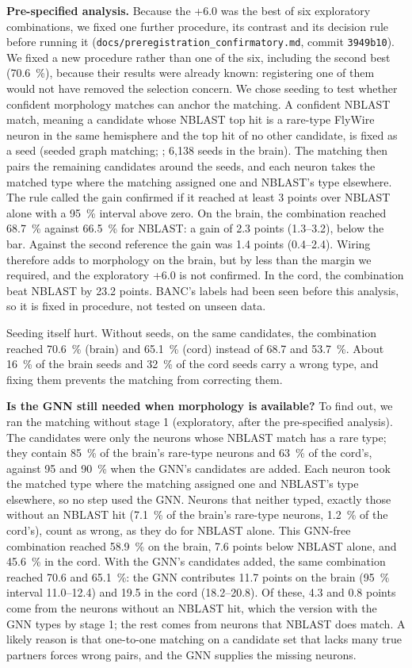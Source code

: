 \documentclass[11pt,a4paper]{article}
\begin{document}
\textbf{Pre-specified analysis.} Because the +6.0 was the best of six exploratory combinations, we fixed one further procedure, its contrast and its decision rule before running it (\texttt{docs/\allowbreak{}preregistration\_\allowbreak{}confirmatory.md}, commit \texttt{3949b10}). We fixed a new procedure rather than one of the six, including the second best (70.6~\%), because their results were already known: registering one of them would not have removed the selection concern. We chose seeding to test whether confident morphology matches can anchor the matching. A confident NBLAST match, meaning a candidate whose NBLAST top hit is a rare-type FlyWire neuron in the same hemisphere and the top hit of no other candidate, is fixed as a seed (seeded graph matching; \citealp{fishkind2019}; 6,138 seeds in the brain). The matching then pairs the remaining candidates around the seeds, and each neuron takes the matched type where the matching assigned one and NBLAST's type elsewhere. The rule called the gain confirmed if it reached at least 3 points over NBLAST alone with a 95~\% interval above zero. On the brain, the combination reached 68.7~\% against 66.5~\% for NBLAST: a gain of 2.3 points (1.3–3.2), below the bar. Against the second reference the gain was 1.4 points (0.4–2.4). Wiring therefore adds to morphology on the brain, but by less than the margin we required, and the exploratory +6.0 is not confirmed. In the cord, the combination beat NBLAST by 23.2 points. BANC's labels had been seen before this analysis, so it is fixed in procedure, not tested on unseen data.

Seeding itself hurt. Without seeds, on the same candidates, the combination reached 70.6~\% (brain) and 65.1~\% (cord) instead of 68.7 and 53.7~\%. About 16~\% of the brain seeds and 32~\% of the cord seeds carry a wrong type, and fixing them prevents the matching from correcting them.

\textbf{Is the GNN still needed when morphology is available?} To find out, we ran the matching without stage 1 (exploratory, after the pre-specified analysis). The candidates were only the neurons whose NBLAST match has a rare type; they contain 85~\% of the brain's rare-type neurons and 63~\% of the cord's, against 95 and 90~\% when the GNN's candidates are added. Each neuron took the matched type where the matching assigned one and NBLAST's type elsewhere, so no step used the GNN. Neurons that neither typed, exactly those without an NBLAST hit (7.1~\% of the brain's rare-type neurons, 1.2~\% of the cord's), count as wrong, as they do for NBLAST alone. This GNN-free combination reached 58.9~\% on the brain, 7.6 points below NBLAST alone, and 45.6~\% in the cord. With the GNN's candidates added, the same combination reached 70.6 and 65.1~\%: the GNN contributes 11.7 points on the brain (95~\% interval 11.0–12.4) and 19.5 in the cord (18.2–20.8). Of these, 4.3 and 0.8 points come from the neurons without an NBLAST hit, which the version with the GNN types by stage 1; the rest comes from neurons that NBLAST does match. A likely reason is that one-to-one matching on a candidate set that lacks many true partners forces wrong pairs, and the GNN supplies the missing neurons.
\end{document}
